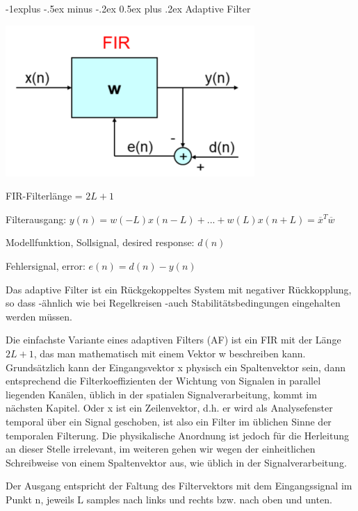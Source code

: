 \documentclass[a4paper]{article}
\makeatletter
\renewcommand{\subsection}{\@startsection{subsection}{2}{0mm}%
 {-1explus -.5ex minus -.2ex}%
 {0.5ex plus .2ex}%
 {\normalfont\normalsize\bfseries}}
\makeatother
\begin{document}
\begin{multicols}{3}
  \subsection{Adaptive Filter}\label{adaptive-filter}

  \begin{itemize*}
    \item \includegraphics[width=.5\linewidth]{Assets/Biosignalverarbeitung-adaptiv-fir.png}
    \begin{itemize*}
      \item FIR-Filterlänge = $2L+1$
      \item Filterausgang: $y(n)=w(-L)x(n-L)+...+ w(L)x(n+L)= \overline{x}^T \overline{w}$
      \item Modellfunktion, Sollsignal, desired response: $d(n)$
      \item Fehlersignal, error: $e(n)=d(n)-y(n)$
    \end{itemize*}
    \item Das adaptive Filter ist ein Rückgekoppeltes System mit negativer Rückkopplung, so dass -ähnlich wie bei Regelkreisen -auch Stabilitätsbedingungen eingehalten werden müssen.
    \item Die einfachste Variante eines adaptiven Filters (AF) ist ein FIR mit der Länge $2L+1$, das man mathematisch mit einem Vektor w beschreiben kann. Grundsätzlich kann der Eingangsvektor x physisch ein Spaltenvektor sein, dann entsprechend die Filterkoeffizienten der Wichtung von Signalen in parallel liegenden Kanälen, üblich in der spatialen Signalverarbeitung, kommt im nächsten Kapitel. Oder x ist ein Zeilenvektor, d.h. er wird als Analysefenster temporal über ein Signal geschoben, ist also ein Filter im üblichen Sinne der temporalen Filterung. Die physikalische Anordnung ist jedoch für die Herleitung an dieser Stelle irrelevant, im weiteren gehen wir wegen der einheitlichen Schreibweise von einem Spaltenvektor aus, wie üblich in der Signalverarbeitung.
    \item Der Ausgang entspricht der Faltung des Filtervektors mit dem Eingangssignal im Punkt n, jeweils L samples nach links und rechts bzw. nach oben und unten.

\end{itemize*}
\end{multicols}
\end{document}

